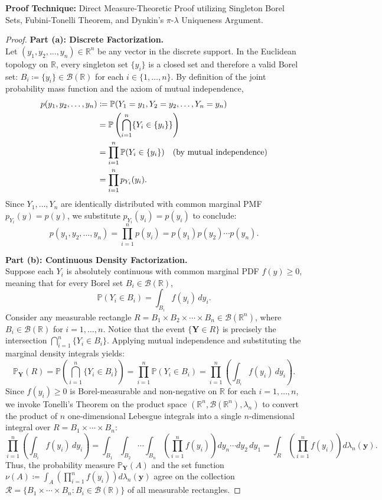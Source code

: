 \documentclass[11pt, letterpaper]{article}
\theoremstyle{definition}
\theoremstyle{remark}
\newcommand{\R}{\mathbb{R}}
\newcommand{\Prob}{\mathbb{P}}
\begin{document}
\textbf{Proof Technique:} Direct Measure-Theoretic Proof utilizing Singleton Borel Sets, Fubini-Tonelli Theorem, and Dynkin's $\pi$-$\lambda$ Uniqueness Argument.

\begin{proof}
\textbf{Part (a): Discrete Factorization.} \\ \relax
Let $(y_1, y_2, \dots, y_n) \in \R^n$ be any vector in the discrete support. In the Euclidean topology on $\R$, every singleton set $\{y_i\}$ is a closed set and therefore a valid Borel set: $B_i \coloneqq \{y_i\} \in \mathcal{B}(\R)$ for each $i \in \{1, \dots, n\}$. By definition of the joint probability mass function and the axiom of mutual independence,
\begin{align*}
    p(y_1, y_2, \dots, y_n) &\coloneqq \Prob(Y_1 = y_1, Y_2 = y_2, \dots, Y_n = y_n) \\ \relax
    &= \Prob\left(\bigcap_{i=1}^{n} \{Y_i \in \{y_i\}\}\right) \\ \relax
    &= \prod_{i=1}^{n} \Prob(Y_i \in \{y_i\}) \quad \text{(by mutual independence)} \\ \relax
    &= \prod_{i=1}^{n} p_{Y_i}(y_i).
\end{align*}
Since $Y_1, \dots, Y_n$ are identically distributed with common marginal PMF $p_{Y_i}(y) = p(y)$, we substitute $p_{Y_i}(y_i) = p(y_i)$ to conclude:
\[
    p(y_1, y_2, \dots, y_n) = \prod_{i=1}^{n} p(y_i) = p(y_1)p(y_2)\cdots p(y_n).
\]

\textbf{Part (b): Continuous Density Factorization.} \\ \relax
Suppose each $Y_i$ is absolutely continuous with common marginal PDF $f(y) \ge 0$, meaning that for every Borel set $B_i \in \mathcal{B}(\R)$,
\[
    \Prob(Y_i \in B_i) = \int_{B_i} f(y_i) \, dy_i.
\]
Consider any measurable rectangle $R = B_1 \times B_2 \times \cdots \times B_n \in \mathcal{B}(\R^n)$, where $B_i \in \mathcal{B}(\R)$ for $i = 1, \dots, n$. Notice that the event $\{\mathbf{Y} \in R\}$ is precisely the intersection $\bigcap_{i=1}^n \{Y_i \in B_i\}$. Applying mutual independence and substituting the marginal density integrals yields:
\[
    \Prob_{\mathbf{Y}}(R) = \Prob\left(\bigcap_{i=1}^{n} \{Y_i \in B_i\}\right) = \prod_{i=1}^{n} \Prob(Y_i \in B_i) = \prod_{i=1}^{n} \left( \int_{B_i} f(y_i) \, dy_i \right).
\]
Since $f(y_i) \ge 0$ is Borel-measurable and non-negative on $\R$ for each $i = 1, \dots, n$, we invoke Tonelli's Theorem on the product space $(\R^n, \mathcal{B}(\R^n), \lambda_n)$ to convert the product of $n$ one-dimensional Lebesgue integrals into a single $n$-dimensional integral over $R = B_1 \times \cdots \times B_n$:
\[
    \prod_{i=1}^{n} \left( \int_{B_i} f(y_i) \, dy_i \right) = \int_{B_1} \int_{B_2} \cdots \int_{B_n} \left(\prod_{i=1}^{n} f(y_i)\right) dy_n \cdots dy_2 \, dy_1 = \int_{R} \left(\prod_{i=1}^{n} f(y_i)\right) d\lambda_n(\mathbf{y}).
\]
Thus, the probability measure $\Prob_{\mathbf{Y}}(A)$ and the set function $\nu(A) \coloneqq \int_{A} \left(\prod_{i=1}^n f(y_i)\right) d\lambda_n(\mathbf{y})$ agree on the collection $\mathcal{R} = \{B_1 \times \cdots \times B_n : B_i \in \mathcal{B}(\R)\}$ of all measurable rectangles.


\end{proof}
\end{document}
